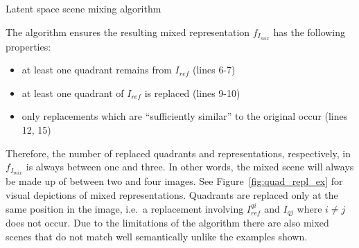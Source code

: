 \documentclass[a4paper,12pt]{report}
\begin{document}
\begin{algorithm}[ht!]
\DontPrintSemicolon
\LinesNumbered
{}
\caption{Latent space scene mixing algorithm}\label{alg:img_mixing_algo}
\end{algorithm}

The algorithm ensures the resulting mixed representation $f_{I_{mix}}$ has the following properties:
\begin{itemize}
   \item at least one quadrant remains from $I_{ref}$ (lines 6-7)
   \item at least one quadrant of $I_{ref}$ is replaced (lines 9-10)
   \item only replacements which are ``sufficiently similar'' to the original occur (lines 12, 15)
\end{itemize}
Therefore, the number of replaced quadrants and representations, respectively, in $f_{I_{mix}}$ is always between one and three. In other words, the mixed scene will always be made up of between two and four images. See Figure~\ref{fig:quad_repl_ex} for visual depictions of mixed representations. Quadrants are replaced only at the same position in the image, i.e.\ a replacement involving $I^{qi}_{ref}$ and $I_{qj}$ where $i \neq j$ does not occur. Due to the limitations of the algorithm there are also mixed scenes that do not match well semantically unlike the examples shown.



\end{document}
